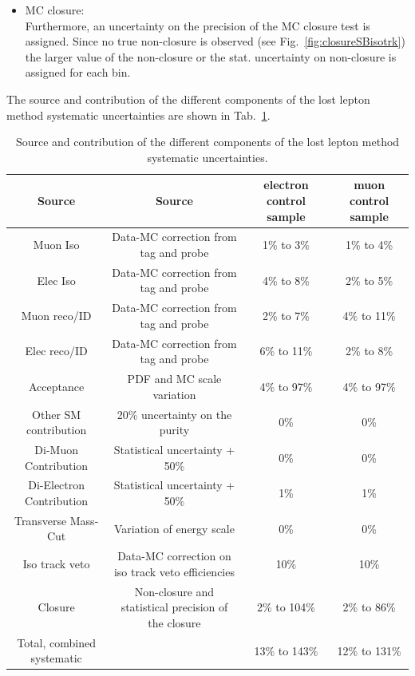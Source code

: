 \begin{itemize}
\item MC closure:\\
Furthermore, an uncertainty on the precision of the MC closure test is assigned. Since no true non-closure is observed (see Fig.~\ref{fig:closureSBisotrk}) the larger value of the non-closure or the stat. uncertainty on non-closure is assigned for each bin. %
\end{itemize}

The source and contribution of the different components of the lost lepton method systematic uncertainties are shown in Tab.~\ref{tab:systematics}.

\begin{table}[htbp]
\fontsize{10 pt}{1.2 em}
\caption{Source and contribution of the different components of the lost 
lepton method systematic uncertainties.} 
\begin{center}
\begin{tabular}{|c|c|c|c|}
\hline
Source & Source & electron control sample & muon control sample\\
\hline
Muon Iso 			& Data-MC correction from tag and probe & 1\% to 3\% & 1\% to 4\% \\
Elec Iso 			& Data-MC correction from tag and probe & 4\% to 8\% & 2\% to 5\% \\
Muon reco/ID 			& Data-MC correction from tag and probe & 2\% to 7\% & 4\% to 11\% \\
Elec reco/ID 			& Data-MC correction from tag and probe & 6\% to 11\% & 2\% to 8\% \\
Acceptance 			& PDF and MC scale variation & 4\% to 97\% & 4\% to 97\% \\ 
Other SM contribution   	& 20\% uncertainty on the purity & 0\% & 0\% \\
Di-Muon Contribution 	        & Statistical uncertainty + 50\% & 0\% & 0\% \\
Di-Electron Contribution 	& Statistical uncertainty + 50\% & 1\% & 1\% \\
Transverse Mass-Cut		& Variation of \MET energy scale & 0\% & 0\% \\
Iso track veto                  & Data-MC correction on iso track veto efficiencies & 10\% & 10\% \\
Closure                         & Non-closure and statistical precision of the closure & 2\% to 104\% & 2\% to 86\% \\
\hline
Total, combined systematic	& & 13\% to 143\% & 12\% to 131\% \\
\hline
\end{tabular}
\end{center}
\label{tab:systematics}
\end{table}

